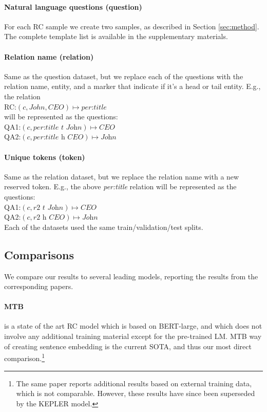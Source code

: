 \documentclass[11pt]{article}
\begin{document}
\paragraph{Natural language questions (question)} For each RC sample we create two samples, as described in Section \ref{sec:method}. The complete template list is available in the supplementary materials.
\paragraph{Relation name (relation)} Same as the question dataset, but we replace each of the questions with the relation name, entity, and a marker that indicate if it's a head or tail entity. E.g., the relation\\ 
\indent RC:$(c, John, CEO) \mapsto \textit{per:title}$\\[0.5em] will be represented as the questions:\\[0.5em]
\indent QA1:$(c, \textit{per:title t John}) \mapsto \textit{CEO}$\\[0.5em]
\indent QA2:$(c, \textit{per:title h CEO}) \mapsto \textit{John}$
\paragraph{Unique tokens (token)} Same as the relation dataset, but we replace the relation name with a new reserved token. E.g., the above \emph{per:title} relation will be represented as the questions:\\[0.5em]
\indent QA1:$(c, \textit{r2 t John}) \mapsto \textit{CEO}$\\[0.5em]
\indent QA2:$(c, \textit{r2 h CEO}) \mapsto \textit{John}$\\[0.2em]

Each of the datasets used the same train/validation/test splits. 

\subsection{Comparisons}
We compare our results to several leading models, reporting the results from the corresponding papers.
\paragraph{MTB} \cite{Soares2019} is a state of the art RC model which is based on BERT-large, and which does not involve any additional training material except for the pre-trained LM. MTB way of creating sentence embedding is the current SOTA, and thus our most direct comparison.\footnote{The same paper reports additional results based on external training data, which is not comparable. However, these results have since been superseded by the KEPLER model.}
\end{document}
